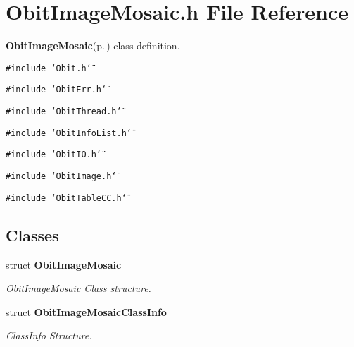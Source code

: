 \section{Obit\-Image\-Mosaic.h File Reference}
\label{ObitImageMosaic_8h}
{\bf Obit\-Image\-Mosaic}{\rm (p.\,\pageref{structObitImageMosaic})} class definition. 

{\tt \#include \char`\"{}Obit.h\char`\"{}}\par
{\tt \#include \char`\"{}Obit\-Err.h\char`\"{}}\par
{\tt \#include \char`\"{}Obit\-Thread.h\char`\"{}}\par
{\tt \#include \char`\"{}Obit\-Info\-List.h\char`\"{}}\par
{\tt \#include \char`\"{}Obit\-IO.h\char`\"{}}\par
{\tt \#include \char`\"{}Obit\-Image.h\char`\"{}}\par
{\tt \#include \char`\"{}Obit\-Table\-CC.h\char`\"{}}\par
\subsection*{Classes}
\begin{CompactItemize}
\item 
struct {\bf Obit\-Image\-Mosaic}
\begin{CompactList}\small\item\em Obit\-Image\-Mosaic Class structure. \item\end{CompactList}\item 
struct {\bf Obit\-Image\-Mosaic\-Class\-Info}
\begin{CompactList}\small\item\em Class\-Info Structure. \item\end{CompactList}\end{CompactItemize}
